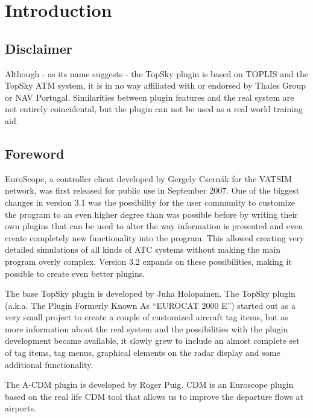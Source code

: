 \documentclass[a4paper,oneside,11pt]{memoir}
\begin{document}
\startmanual

\chapter{Introduction}

\section{Disclaimer}

Although - as its name suggests - the TopSky plugin is based on TOPLIS and the TopSky ATM system, it is in no way affiliated with or endorsed by Thales Group or NAV Portugal. Similarities between plugin features and the real system are not entirely coincidental, but the plugin can not be used as a real world training aid.

\section{Foreword}

EuroScope, a controller client developed by Gergely Csernák for the VATSIM network, was first released for public use in September 2007. One of the biggest changes in version 3.1 was the possibility for the user community to customize the program to an even higher degree than was possible before by writing their own plugins that can be used to alter the way information is presented and even create completely new functionality into the program. This allowed creating very detailed simulations of all kinds of ATC systems without making the main program overly complex. Version 3.2 expands on these possibilities, making it possible to create even better plugins.

\bigskip

The base TopSky plugin is developed by Juha Holopainen. The TopSky plugin (a.k.a. The Plugin Formerly Known As “EUROCAT 2000 E”) started out as a very small project to create a couple of customized aircraft tag items, but as more information about the real system and the possibilities with the plugin development became available, it slowly grew to include an almost complete set of tag items, tag menus, graphical elements on the radar display and some additional functionality.\cite{topskygen}

\bigskip

The A-CDM plugin is developed by Roger Puig. CDM is an Euroscope plugin based on the real life CDM tool that allows us to improve the departure flows at airports.\cite{cdm}
\end{document}
